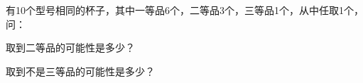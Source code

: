 有10个型号相同的杯子，其中一等品6个，二等品3个，三等品1个，从中任取1个，问：

\begin{subquestions}

    \subquestion 取到二等品的可能性是多少？

    \subquestion 取到不是三等品的可能性是多少？

\end{subquestions}





